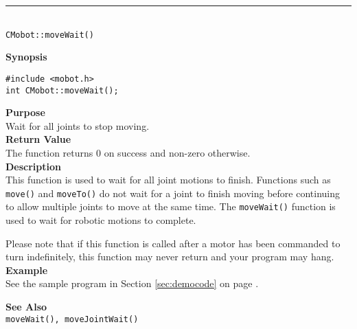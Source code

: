 \noindent
\vspace{5pt}
\rule{4.5in}{0.015in}\\
\noindent
{\LARGE \texttt{CMobot::moveWait()}}\\
{}

\noindent
{\bf Synopsis}
\vspace{-8pt}
\begin{verbatim}
#include <mobot.h>
int CMobot::moveWait();
\end{verbatim}

\noindent
{\bf Purpose}\\
Wait for all joints to stop moving.\\

\noindent
{\bf Return Value}\\
The function returns 0 on success and non-zero otherwise.\\

\noindent
{\bf Description}\\
This function is used to wait for all joint motions to finish. Functions such as
\texttt{move()} and \texttt{moveTo()} do not wait for a joint to finish
moving before continuing to allow multiple joints to move at the same time. The
\texttt{moveWait()} function is used to wait for
robotic motions to complete.

Please note that if this function is called after a motor has been commanded to
turn indefinitely, this function may never return and your program may hang.\\

\noindent
{\bf Example}\\
See the sample program in Section \ref{sec:democode} on page \pageref{sec:democode}.
\noindent

\noindent
{\bf See Also}\\
\texttt{moveWait(), moveJointWait()}

